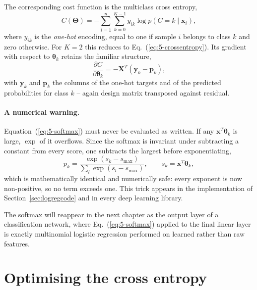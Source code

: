 The corresponding cost function is the multiclass cross entropy,
\begin{equation}
  C(\bm{\Theta}) = -\sum_{i=1}^{n}\sum_{k=0}^{K-1}
    y_{ik}\log p(C=k\mid\bm{x}_i),
  \label{eq:5-multicrossentropy}
\end{equation}
where $y_{ik}$ is the \emph{one-hot} encoding, equal to one if sample $i$
belongs to class $k$ and zero otherwise.  For $K=2$ this reduces to
Eq.~(\ref{eq:5-crossentropy}).  Its gradient with respect to
$\bm{\theta}_k$ retains the familiar structure,
\begin{equation}
  \frac{\partial C}{\partial\bm{\theta}_k}
   = -\bm{X}^{T}\left(\bm{y}_{k}-\bm{p}_{k}\right),
  \label{eq:5-softmaxgradient}
\end{equation}
with $\bm{y}_k$ and $\bm{p}_k$ the columns of the one-hot targets and of the
predicted probabilities for class $k$ -- again design matrix transposed
against residual.

\paragraph{A numerical warning.}
Equation~(\ref{eq:5-softmax}) must never be evaluated as written.  If any
$\bm{x}^{T}\bm{\theta}_k$ is large, $\exp$ of it overflows.  Since the softmax
is invariant under subtracting a constant from every score, one subtracts the
largest before exponentiating,
\begin{equation}
  p_k = \frac{\exp\left(s_k-s_{\max}\right)}
             {\sum_l\exp\left(s_l-s_{\max}\right)},
  \qquad s_k=\bm{x}^{T}\bm{\theta}_k,
  \label{eq:5-softmaxstable}
\end{equation}
which is mathematically identical and numerically safe: every exponent is now
non-positive, so no term exceeds one.  This trick appears in the
implementation of Section~\ref{sec:logregcode} and in every deep learning
library.

The softmax will reappear in the next chapter as the output layer of a
classification network, where Eq.~(\ref{eq:5-softmax}) applied to the final
linear layer is exactly multinomial logistic regression performed on learned
rather than raw features.

\section{Optimising the cross entropy}
\label{sec:logregoptim}

